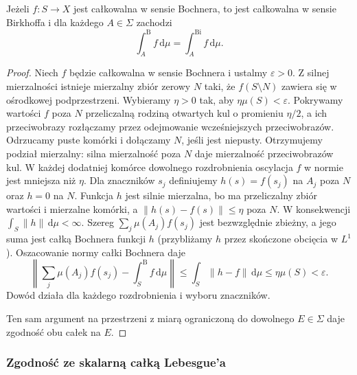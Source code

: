 \begin{twierdzenie}
\label{thm:bochner-implies-birkhoff15b}
Jeżeli $f:S\to X$ jest całkowalna w sensie Bochnera,
to jest całkowalna w sensie Birkhoffa i dla każdego
$A\in\Sigma$ zachodzi
\[
 \int_A^{\mathrm B}f\,\mathrm d\mu
 =\int_A^{\mathrm{Bi}}f\,\mathrm d\mu.
\]
\end{twierdzenie}
\begin{proof}
Niech $f$ będzie całkowalna w sensie Bochnera i ustalmy $\varepsilon>0$.
Z silnej mierzalności istnieje mierzalny zbiór zerowy $N$
taki, że $f(S\setminus N)$ zawiera się w ośrodkowej
podprzestrzeni. Wybieramy $\eta>0$ tak, aby
$\eta\mu(S)<\varepsilon$. Pokrywamy wartości $f$
poza $N$ przeliczalną rodziną otwartych kul
o promieniu $\eta/2$, a ich przeciwobrazy rozłączamy
przez odejmowanie wcześniejszych przeciwobrazów.
Odrzucamy puste komórki i dołączamy $N$, jeśli
jest niepusty. Otrzymujemy podział mierzalny:
silna mierzalność poza $N$ daje mierzalność
przeciwobrazów kul.
W każdej dodatniej komórce dowolnego rozdrobnienia
oscylacja $f$ w normie jest mniejsza niż $\eta$.
Dla znaczników $s_j$ definiujemy $h(s)=f(s_j)$
na $A_j$ poza $N$ oraz $h=0$ na $N$.
Funkcja $h$ jest silnie mierzalna, bo ma przeliczalny
zbiór wartości i mierzalne komórki, a
$\|h(s)-f(s)\|\le\eta$ poza $N$.
W konsekwencji $\int_S\|h\|\,\mathrm d\mu<\infty$.
Szereg $\sum_j\mu(A_j)f(s_j)$ jest bezwzględnie
zbieżny, a jego suma jest całką Bochnera funkcji $h$
(przybliżamy $h$ przez skończone obcięcia w $L^1$).
Oszacowanie normy całki Bochnera daje
\[
 \left\|\sum_j\mu(A_j)f(s_j)
        -\int_S^{\mathrm B} f\,\mathrm d\mu\right\|
 \le\int_S\|h-f\|\,\mathrm d\mu\le\eta\mu(S)<\varepsilon.
\]
Dowód działa dla każdego rozdrobnienia i wyboru znaczników.

Ten sam argument na przestrzeni z miarą ograniczoną
do dowolnego $E\in\Sigma$ daje zgodność obu całek
na $E$.
\end{proof}

\subsubsection{Zgodność ze skalarną całką Lebesgue'a}

